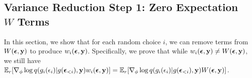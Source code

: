 \subsection{Variance Reduction Step 1: Zero Expectation $W$ Terms}

In this section, we show that for each random choice $i$, we can remove terms from $W(\bm{\epsilon}, \mathbf{y})$ to produce $w_i(\bm{\epsilon}, \mathbf{y})$. Specifically, we prove that while $w_i(\bm{\epsilon}, \mathbf{y}) \neq W(\bm{\epsilon}, \mathbf{y})$, we still have $\mathbb{E}_{r} [ \nabla_\phi \log q(g_i(\epsilon_i) | g(\bm{\epsilon}_{<i}), \mathbf{y}) w_i(\bm{\epsilon}, \mathbf{y}) ] = \mathbb{E}_{r} [ \nabla_\phi \log q(g_i(\epsilon_i) | g(\bm{\epsilon}_{<i}), \mathbf{y}) W(\bm{\epsilon}, \mathbf{y}) ]$.

